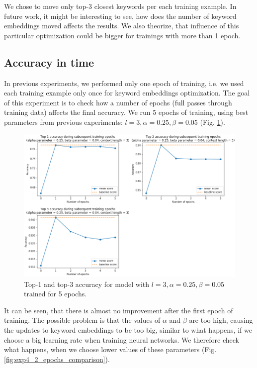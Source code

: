 \documentclass{llncs}
\begin{document}
We chose to move only top-3 closest keywords per each training example. In future work, it might be interesting to see, how does the number of keyword embeddings moved affects the results. We also theorize, that influence of this particular optimization could be bigger for trainings with more than 1 epoch.

\subsection{Accuracy in time}
\label{sec:exp_epochs}
In previous experiments, we performed only one epoch of training, i.e. we used each training example only once for keyword embeddings optimization.
The goal of this experiment is to check how a number of epochs (full passes through training data) affects the final accuracy.
We run 5 epochs of training, using best parameters from previous experiments: \(l=3, \alpha=0.25, \beta=0.05\) (Fig. \ref{fig:exp4_1_epochs_fixed}).

\begin{figure}
    \centering
    \caption{Top-1 and top-3 accuracy for model with \(l=3, \alpha=0.25, \beta=0.05\) trained for 5 epochs.}
    \label{fig:exp4_1_epochs_fixed}
    \includegraphics[scale=0.65]{res/exp4_epoch_top_acc.png}
\end{figure}

It can be seen, that there is almost no improvement after the first epoch of training.
The possible problem is that the values of \(\alpha\) and \(\beta\) are too high, causing the updates to keyword embeddings to be too big, similar to what happens, if we choose a big learning rate when training neural networks.
We therefore check what happens, when we choose lower values of these parameters (Fig. \ref{fig:exp4_2_epochs_comparison}).
\end{document}
